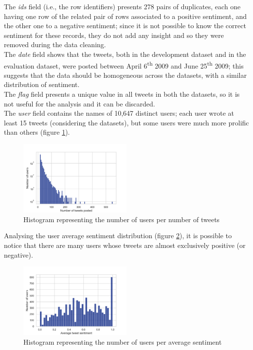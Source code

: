 \documentclass[conference]{IEEEtran}
\begin{document}
The \textit{ids} field (i.e., the row identifiers) presents 278 pairs of duplicates, each one having one row of the related pair of rows associated to a positive sentiment, and the other one to a negative sentiment; since it is not possible to know the correct sentiment for these records, they do not add any insight and so they were removed during the data cleaning. \\
The \textit{date} field shows that the tweets, both in the development dataset and in the evaluation dataset, were posted between April 6\textsuperscript{th} 2009 and June 25\textsuperscript{th} 2009; this suggests that the data should be homogeneous across the datasets, with a similar distribution of sentiment. \\
The \textit{flag} field presents a unique value in all tweets in both the datasets, so it is not useful for the analysis and it can be discarded. \\
The \textit{user} field contains the names of 10,647 distinct users; each user wrote at least 15 tweets (considering the datasets), but some users were much more prolific than others (figure \ref{fig:user_per_tweet}).
\begin{figure}
    \includegraphics[width=0.5\textwidth]{user_per_tweet}
    \caption[Histogram of users per tweets]{Histogram representing the number of users per number of tweets}
    \label{fig:user_per_tweet}
\end{figure}
Analysing the user average sentiment distribution (figure \ref{fig:average_user_sentiment}), it is possible to notice that there are many users whose tweets are almost exclusively positive (or negative).
\begin{figure}
    \includegraphics[width=0.5\textwidth]{average_user_sentiment}
    \caption[User average sentiment]{Histogram representing the number of users per average sentiment}
    \label{fig:average_user_sentiment}
\end{figure}
\end{document}
